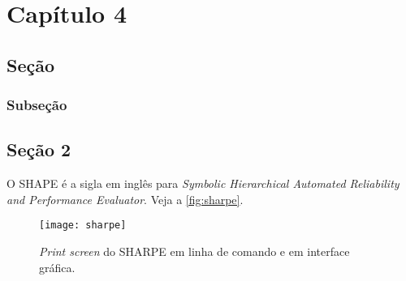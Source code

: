 \chapter[Capítulo 4]{Capítulo 4}
\label{ch:cap4}
\lipsum[3-5]

\section{Seção}

\lipsum[1-1]

\subsection{Subseção}
\lipsum[3-3]

\section{Seção 2}\label{secao2}

O SHAPE é a sigla em inglês para \textit{Symbolic Hierarchical Automated Reliability and Performance Evaluator}. Veja a  \autoref{fig:sharpe}.

\begin{figure}[!h]
	\texttt{[image: sharpe]}
	\centering
	\caption[\textit{Print screen} do SHARPE em linha de comando e em interface gráfica.]{\textit{Print screen} do SHARPE em linha de comando e em interface gráfica.}
	\label{fig:sharpe}
\end{figure}